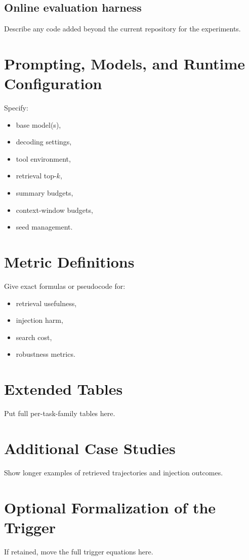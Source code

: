\documentclass{article}
\begin{document}
\subsection{Online evaluation harness}
Describe any code added beyond the current repository for the experiments.

\section{Prompting, Models, and Runtime Configuration}
Specify:
\begin{itemize}[leftmargin=*,itemsep=2pt,topsep=2pt]
    \item base model(s),
    \item decoding settings,
    \item tool environment,
    \item retrieval top-$k$,
    \item summary budgets,
    \item context-window budgets,
    \item seed management.
\end{itemize}

\section{Metric Definitions}
Give exact formulas or pseudocode for:
\begin{itemize}[leftmargin=*,itemsep=2pt,topsep=2pt]
    \item retrieval usefulness,
    \item injection harm,
    \item search cost,
    \item robustness metrics.
\end{itemize}

\section{Extended Tables}
Put full per-task-family tables here.

\section{Additional Case Studies}
Show longer examples of retrieved trajectories and injection outcomes.

\section{Optional Formalization of the Trigger}
If retained, move the full trigger equations here.
\end{document}
